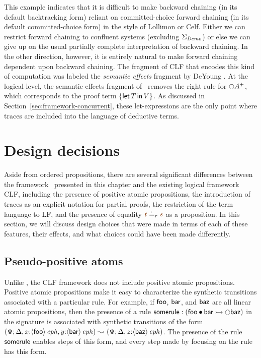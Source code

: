 This example indicates that it is difficult to make backward chaining
(in its default backtracking form) reliant on committed-choice forward
chaining (in its default committed-choice form) in the style of
Lollimon or Celf. Either we can restrict forward chaining to confluent
systems (excluding $\Sigma_{\it Demo}$) or else we can give up on the
usual partially complete interpretation of backward chaining.  In the
other direction, however, it is entirely natural to make forward
chaining dependent upon backward chaining. The fragment of CLF that
encodes this kind of computation was labeled the {\it semantic
  effects} fragment by DeYoung \cite{deyoung09reasoning}. At the
logical level, the semantic effects fragment of \sls~removes the right
rule for ${\ocircle}A^+$, which corresponds to the proof term
$\{{\sf let}\,{T}\,{\sf in}\, {V} \}$.  As discussed in
Section~\ref{sec:framework-concurrent}, these
let-expressions are the only point
where traces are included into the language of
deductive terms.

\section{Design decisions}
\label{sec:designdecisions}

Aside from ordered propositions, there are several significant
differences between the framework \sls~presented in this chapter and
the existing logical framework CLF, including the presence of positive
atomic propositions, the introduction of traces as an explicit
notation for partial proofs, the restriction of the term language to
LF, and the presence of equality $\lf{t} \doteq_\tau \lf{s}$ as a
proposition. In this section, we will discuss design choices that were
made in terms of each of these features, their effects, and what
choices could have been made differently.

\subsection{Pseudo-positive atoms}
\label{sec:pseudopositive}

Unlike \sls, the CLF framework does not include positive atomic
propositions. Positive atomic propositions make it easy to
characterize the synthetic transitions associated with a particular
rule. For example, if ${\sf foo}$, ${\sf bar}$, and ${\sf baz}$ are
all linear atomic propositions, then the presence of a rule ${\sf
  somerule} : \left({\sf foo} \mathbin{\bullet} {\sf bar} \rightarrowtail {\ocircle}{\sf
    baz}\right)$ in the signature is associated with synthetic
transitions of the form
%
$(\Psi; {\Delta},{{x{:}{\langle {\sf
        foo} \rangle}\,{{\it eph}}},{y{:}{\langle {\sf bar} \rangle}\,{{\it eph}}}})
 \leadsto
 (\Psi; {\Delta},{z{:}{\langle {\sf baz} \rangle}\,{{\it eph}}})$.
%
The presence of the
rule $\sf somerule$ enables steps of this form, and every step made by
focusing on the rule has this form.

